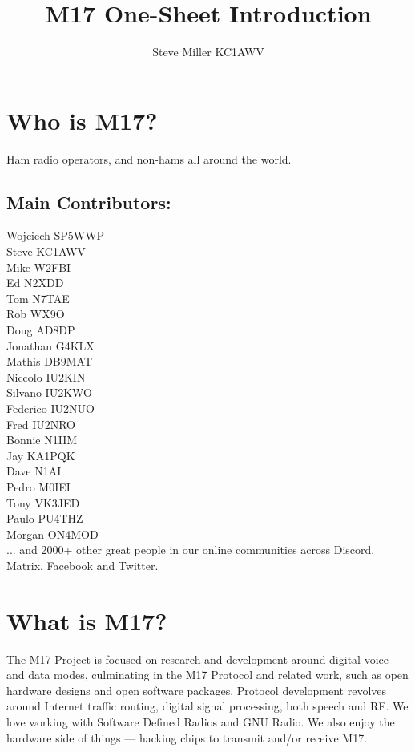 \documentclass[10pt,letterpaper,notitlepage]{article}
\author{Steve Miller KC1AWV}
\title{M17 One-Sheet Introduction}
\begin{document}
  \begin{multicols}{2}
  \section*{Who is M17?}
    Ham radio operators, and non-hams all around the world.
    \subsection*{Main Contributors:}
      Wojciech SP5WWP\\
      Steve KC1AWV\\
      Mike W2FBI\\
      Ed N2XDD\\
      Tom N7TAE\\
      Rob WX9O\\
      Doug AD8DP\\
      Jonathan G4KLX\\
      Mathis DB9MAT\\
      Niccolo IU2KIN\\
      Silvano IU2KWO\\
      Federico IU2NUO\\
      Fred IU2NRO\\
      Bonnie N1IIM\\
      Jay KA1PQK\\
      Dave N1AI\\
      Pedro M0IEI\\
      Tony VK3JED\\
      Paulo PU4THZ\\
      Morgan ON4MOD\\
      \justifying
      ... and 2000+ other great people in our online communities
      across Discord, Matrix, Facebook and Twitter.
  \section*{What is M17?}
    \justifying
    The M17 Project is focused on research and development around digital voice and data modes, culminating in the M17 Protocol and related work, such as open hardware designs and open software packages. Protocol development revolves around Internet traffic routing, digital signal processing, both speech and RF. We love working with Software Defined Radios and GNU Radio. We also enjoy the hardware side of things — hacking chips to transmit and/or receive M17.
  \columnbreak

\end{multicols}
\end{document}
